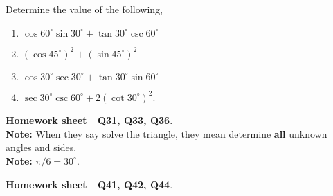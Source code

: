 \documentclass[12pt]{article} %
\begin{document}
\begin{qstn}
  Determine the value of the following,
  \begin{enumerate}[label=(\alph*)]
    \item $ \cos 60^{\circ}\sin 30^{\circ} + \tan 30^{\circ}\csc 60^{\circ}$
    \item $ \left( \cos 45^{\circ}\right)^2 + \left( \sin 45^{\circ}\right)^2 $
    \item $ \cos 30^{\circ}\sec 30^{\circ} + \tan 30^{\circ}\sin 60^{\circ}$
    \item $ \sec 30^{\circ}\csc 60^{\circ} + 2\left(\cot 30^{\circ}\right)^2$.
  \end{enumerate}
\end{qstn}

\begin{qstn}
  \textbf{Homework sheet \,\, Q31, Q33, Q36}. \\
  \textbf{Note:} When they say solve the triangle, they mean determine \textbf{all} unknown angles and sides.\\
  \textbf{Note:} $\pi / 6 = 30^{\circ}$.
\end{qstn}

\begin{qstn}
  \textbf{Homework sheet \,\, Q41, Q42, Q44}.
\end{qstn}
\end{document}
